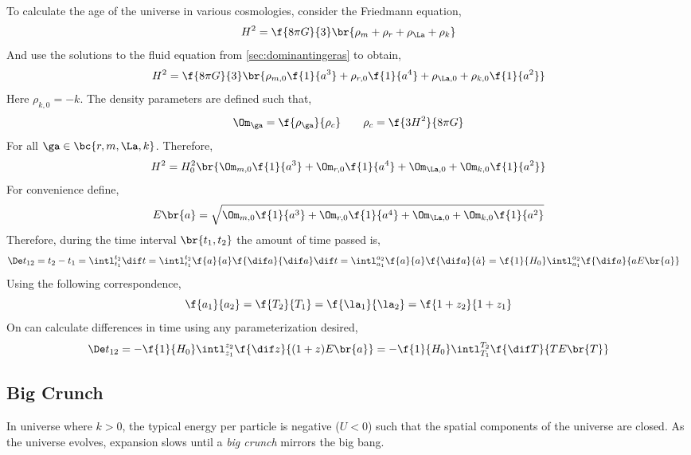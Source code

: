 \documentclass{article}
\begin{document}
To calculate the age of the universe in various cosmologies, consider the Friedmann equation,
\[ H^2 = \f{8 \pi G}{3} \br{\rho_m + \rho_r + \rho_\La + \rho_k} \]
And use the solutions to the fluid equation from \cref{sec:dominantingeras} to obtain,
\[ H^2 = \f{8 \pi G}{3} \br{\rho_{m,0}\f{1}{a^3} + \rho_{r,0}\f{1}{a^4} + \rho_{\La,0} + \rho_{k,0}\f{1}{a^2} } \]
Here $\rho_{k,0} = -k$. The density parameters are defined such that,
\[ \Om_{\ga} = \f{\rho_{\ga}}{\rho_{c}} \qquad \rho_{c} = \f{3 H^2}{8 \pi G} \]
For all $\ga \in \bc{r, m , \La, k}$. Therefore,
\[ H^2 = H_0^2\br{\Om_{m,0}\f{1}{a^3} + \Om_{r,0}\f{1}{a^4} + \Om_{\La,0} + \Om_{k,0}\f{1}{a^2} } \]
For convenience define,
\[ E\br{a} = \sqrt{\Om_{m,0}\f{1}{a^3} + \Om_{r,0}\f{1}{a^4} + \Om_{\La,0} + \Om_{k,0}\f{1}{a^2} } \]
Therefore, during the time interval $\br{t_1, t_2}$ the amount of time passed is,
\begin{align*}
    \De t_{12}
    &= t_2 - t_1 = \intl_{t_1}^{t_2} \dif t = \intl_{t_1}^{t_2} \f{a}{a} \f{\dif a}{\dif a} \dif t = \intl_{a_1}^{a_2} \f{a}{a} \f{\dif a}{\dot a} = \f{1}{H_0}\intl_{a_1}^{a_2} \f{\dif a}{a E\br{a}}
\end{align*}
Using the following correspondence,
\[ \f{a_1}{a_2} = \f{T_2}{T_1} = \f{\la_1}{\la_2} = \f{1 + z_2}{1 + z_1} \]
On can calculate differences in time using any parameterization desired,
\[ \De t_{12} = -\f{1}{H_0} \intl_{z_1}^{z_2} \f{\dif z}{(1+z) E\br{a}} = -\f{1}{H_0}\intl_{T_1}^{T_2} \f{\dif T}{T E\br{T}} \]
\subsection{Big Crunch}
In universe where $k > 0$, the typical energy per particle is negative ($U < 0$) such that the spatial components of the universe are closed. As the universe evolves, expansion slows until a \textit{big crunch} mirrors the big bang. \\
\end{document}
